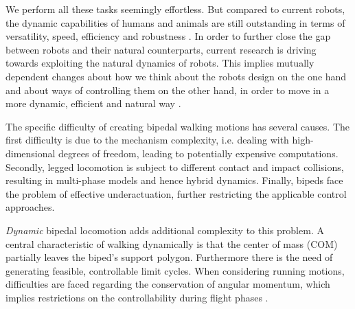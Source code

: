 We perform all these tasks seemingly effortless. But compared to current robots, the dynamic capabilities of humans and animals are still outstanding in terms of versatility, speed, efficiency and robustness \cite{hutter2012starleth}. In order to further close the gap between robots and their natural counterparts, current research is driving towards exploiting the natural dynamics of robots. This implies mutually dependent changes about how we think about the robots design \cite{pratt2004series} on the one hand and about ways of controlling them on the other hand, in order to move in a more dynamic, efficient and natural way \cite{collins2005efficient, haddadin2012optimal, pratt2000exploiting}.

The specific difficulty of creating bipedal walking motions has several causes. The first difficulty is due to the mechanism complexity, i.e. dealing with high-dimensional degrees of freedom, leading to potentially expensive computations. Secondly, legged locomotion is subject to different contact and impact collisions, resulting in multi-phase models and hence hybrid dynamics. Finally, bipeds face the problem of effective underactuation, further restricting the applicable control approaches.

\textit{Dynamic} bipedal locomotion adds additional complexity to this problem. A central characteristic of walking dynamically is that the center of mass (COM) partially leaves the biped's support polygon. Furthermore there is the need of generating feasible, controllable limit cycles. When considering running motions, difficulties are faced regarding the conservation of angular momentum, which implies restrictions on the controllability during flight phases \cite{westervelt2018feedback}. 



